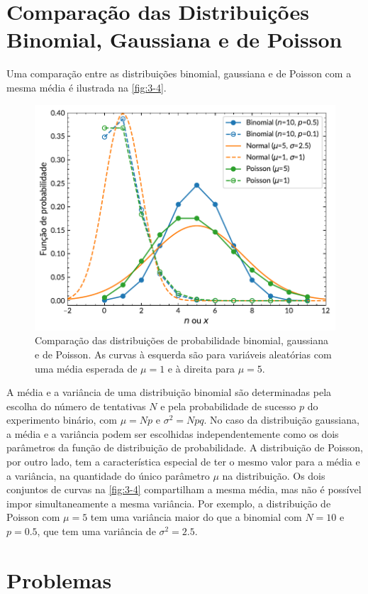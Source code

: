 \section{Comparação das Distribuições Binomial, Gaussiana e de Poisson}

Uma comparação entre as distribuições binomial, gaussiana e de Poisson com a mesma média é ilustrada na \autoref{fig:3-4}.

\begin{figure}
	\centering
	\includegraphics[width=0.7\linewidth]{Figuras/3-4.pdf}
	\caption{Comparação das distribuições de probabilidade binomial, gaussiana e de Poisson. As curvas à esquerda são para variáveis aleatórias com uma média esperada de $\mu = 1$ e à direita para $\mu = 5$.}
	\label{fig:3-4}
\end{figure}

A média e a variância de uma distribuição binomial são determinadas pela escolha do número de tentativas $N$ e pela probabilidade de sucesso $p$ do experimento binário, com $\mu = Np$ e $\sigma^2 = Npq$. No caso da distribuição gaussiana, a média e a variância podem ser escolhidas independentemente como os dois parâmetros da função de distribuição de probabilidade. A distribuição de Poisson, por outro lado, tem a característica especial de ter o mesmo valor para a média e a variância, na quantidade do único parâmetro $\mu$ na distribuição. Os dois conjuntos de curvas na \autoref{fig:3-4} compartilham a mesma média, mas não é possível impor simultaneamente a mesma variância. Por exemplo, a distribuição de Poisson com $\mu = 5$ tem uma variância maior do que a binomial com $N = 10$ e $p = 0.5$, que tem uma variância de $\sigma^2 = 2.5$.

\section{Problemas}

